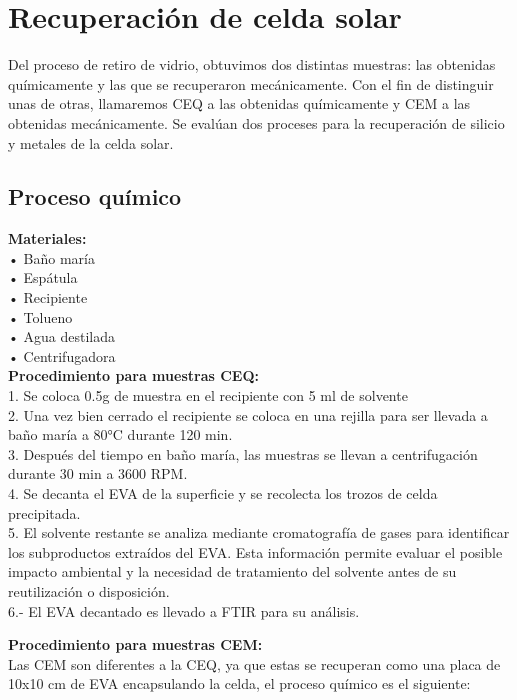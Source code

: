 \section{Recuperación de celda solar}
\label{sec:Recuperación de celda solar} 

Del proceso de retiro de vidrio, obtuvimos dos distintas muestras: las obtenidas químicamente y las que se recuperaron mecánicamente. Con el fin de distinguir unas de otras, llamaremos CEQ a las obtenidas químicamente y CEM a las obtenidas mecánicamente. 
Se evalúan dos proceses para la recuperación de silicio y metales de la celda solar.  

\subsection{Proceso químico}
\label{sec:proceso químico}

\textbf{Materiales:}\\ 
• Baño maría\\  
• Espátula\\ 
• Recipiente\\ 
• Tolueno\\
• Agua destilada\\
• Centrifugadora\\  

\textbf{Procedimiento para muestras CEQ:}\\ 
1.	Se coloca 0.5g de muestra en el recipiente con 5 ml de solvente\\ 
2. Una vez bien cerrado el recipiente se coloca en una rejilla para ser llevada a baño maría a 80°C durante 120 min.\\
3. Después del tiempo en baño maría, las muestras se llevan a centrifugación durante 30 min a 3600 RPM.\\
4. Se decanta el EVA de la superficie y se recolecta los trozos de celda precipitada.\\
5. El solvente restante se analiza mediante cromatografía de gases para identificar los subproductos extraídos del EVA. Esta información permite evaluar el posible impacto ambiental y la necesidad de tratamiento del solvente antes de su reutilización o disposición.\\
6.- El EVA decantado es llevado a FTIR para su análisis.

\textbf{Procedimiento para muestras CEM:}\\
Las CEM son diferentes a la CEQ, ya que estas se recuperan como una placa de 10x10 cm de EVA encapsulando la celda, el proceso químico es el siguiente:

